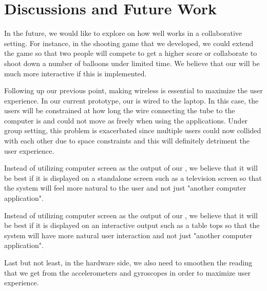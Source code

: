 \section{Discussions and Future Work}\label{sec:fut-work}
In the future, we would like to explore on how well \tube works in a collaborative setting. For instance, in the shooting game that we developed, we could extend the game so that two people will compete to get a higher score or collaborate to shoot down a number of balloons under limited time. We believe that our \tube will be much more interactive if this is implemented.

Following up our previous point, making \tube wireless is essential to maximize the user experience. In our current prototype, our \tube is wired to the laptop. In this case, the users will be constrained at how long the wire connecting the tube to the computer is and could not move as freely when using the applications. Under group setting, this problem is exacerbated since multiple users could now collided with each other due to space constraints and this will definitely detriment the user experience.

Instead of utilizing computer screen as the output of our \tube, we believe that it will be best if it is displayed on a standalone screen such as a television screen so that the \tube system will feel more natural to the user and not just "another computer application".

Instead of utilizing computer screen as the output of our \tube, we believe that it will be best if it is displayed on an interactive output such as a table tops so that the \tube system will have more natural user interaction and not just "another computer application".

Last but not least, in the hardware side, we also need to smoothen the reading that we get from the accelerometers and gyroscopes in order to maximize user experience.


